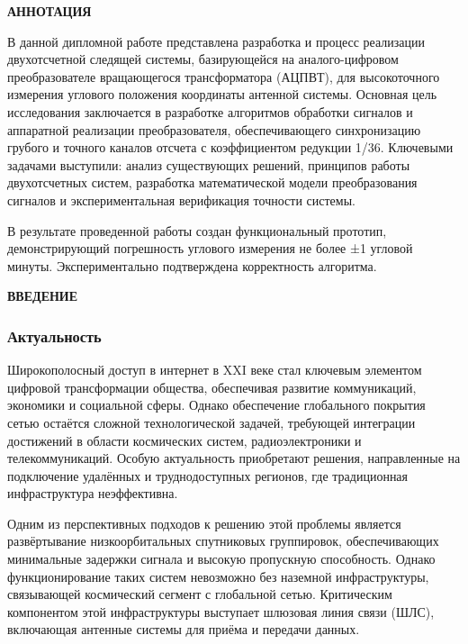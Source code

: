 \newpage
\begin{center}
  \textbf{\large АННОТАЦИЯ}
\end{center}

В данной дипломной работе представлена разработка и процесс реализации двухотсчетной следящей системы, 
базирующейся на аналого-цифровом преобразователе вращающегося трансформатора (АЦПВТ), 
для высокоточного измерения углового положения координаты антенной системы. 
Основная цель исследования заключается в разработке алгоритмов обработки сигналов и аппаратной реализации преобразователя, 
обеспечивающего синхронизацию грубого и точного каналов отсчета с коэффициентом редукции 1/36. 
Ключевыми задачами выступили: анализ существующих решений, принципов работы двухотсчетных систем, разработка математической модели преобразования сигналов и
экспериментальная верификация точности системы.

В результате проведенной работы создан функциональный прототип, демонстрирующий погрешность углового измерения не более ±1 угловой минуты.
Экспериментально подтверждена корректность алгоритма.


\onehalfspacing
\setcounter{page}{2}

\newpage
\renewcommand{\contentsname}{\centerline{\large СОДЕРЖАНИЕ}}
\tableofcontents

\newpage
\begin{center}
  \textbf{\large ВВЕДЕНИЕ}
\end{center}


\subsubsection{Актуальность} 

Широкополосный доступ в интернет в XXI веке стал ключевым элементом цифровой трансформации общества, 
обеспечивая развитие коммуникаций, экономики и социальной сферы. Однако обеспечение глобального покрытия сетью 
остаётся сложной технологической задачей, требующей интеграции достижений в области космических систем, радиоэлектроники 
и телекоммуникаций. Особую актуальность приобретают решения, направленные на подключение удалённых и труднодоступных регионов, 
где традиционная инфраструктура неэффективна.

Одним из перспективных подходов к решению этой проблемы является развёртывание низкоорбитальных спутниковых группировок, 
обеспечивающих минимальные задержки сигнала и высокую пропускную способность. Однако функционирование таких систем невозможно без наземной инфраструктуры, 
связывающей космический сегмент с глобальной сетью. Критическим компонентом этой инфраструктуры выступает шлюзовая линия связи (ШЛС), 
включающая антенные системы для приёма и передачи данных.

